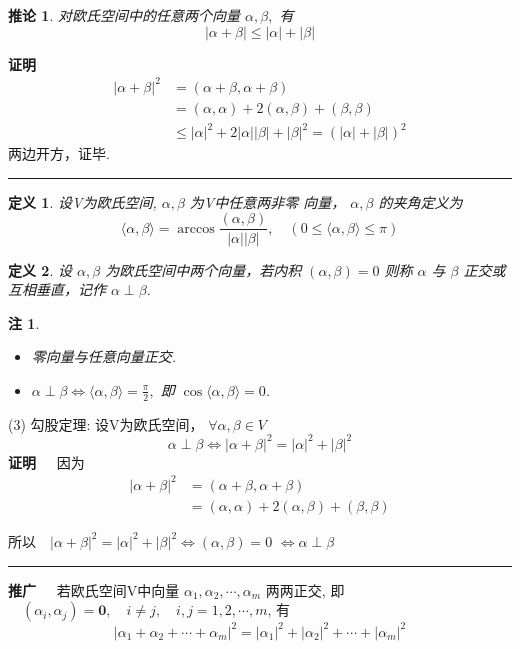 \documentclass[13pt]{beamer}
\newtheorem*{defi}{定义}
\newtheorem*{coro}{推论}
\newtheorem*{rem}{注}
\def\qed{\nopagebreak\hfill{\rule{4pt}{7pt}}\medbreak}
\def\pf{{\bf 证明~~ }}
\begin{document}
\begin{frame}
\begin{coro}
对欧氏空间中的任意两个向量 $\alpha, \beta,$ 有
$$|\alpha+\beta| \leq|\alpha|+|\beta|$$
\end{coro}
\pf 
\[
\begin{aligned}
|\alpha+\beta|^{2}& =(\alpha+\beta, \alpha+\beta) \\
\quad& =(\alpha, \alpha)+2(\alpha, \beta)+(\beta, \beta) \\
\quad & \leq|\alpha|^{2}+2|\alpha||\beta|+|\beta|^{2}=(|\alpha|+|\beta|)^{2}
\end{aligned}
\]
两边开方，证毕.
\qed
\end{frame}




\begin{frame}
\begin{defi}
	设V为欧氏空间, $\alpha, \beta$ 为V中任意两非零
向量， 
$\alpha, \beta$ 的夹角定义为
\[
\langle\alpha, \beta\rangle=\arccos \frac{(\alpha, \beta)}{|\alpha||\beta|},
\quad
(0 \leq\langle\alpha, \beta\rangle \leq \pi)
\]
\end{defi}
%
\begin{defi}
	设 $\alpha, \beta$ 为欧氏空间中两个向量，若内积
$
(\alpha, \beta)=0
$
则称 $\alpha$ 与 $\beta$ 正交或互相垂直，记作 $\alpha \perp \beta$.
\end{defi}
\begin{rem}
	\begin{itemize}
		\item 零向量与任意向量正交.
		 \item $\alpha \perp \beta \Longleftrightarrow\langle\alpha, \beta\rangle=\frac{\pi}{2},$ 即 $\cos \langle\alpha, \beta\rangle=0$.
	\end{itemize}
\end{rem}

\end{frame}

\begin{frame}
(3) 勾股定理:
设V为欧氏空间， $\forall \alpha, \beta \in V$
$$\alpha \perp \beta \Longleftrightarrow|\alpha+\beta|^{2}=|\alpha|^{2}+|\beta|^{2}$$
\pf
因为$$
\begin{aligned}
|\alpha+\beta|^{2}& =(\alpha+\beta, \alpha+\beta) \\ 
	& =(\alpha, \alpha)+2(\alpha, \beta)+(\beta, \beta) 
\end{aligned}$$

所以$\quad|\alpha+\beta|^{2}=|\alpha|^{2}+|\beta|^{2} \Longleftrightarrow(\alpha, \beta)=0$
$\Longleftrightarrow \alpha \perp \beta$ \qed

{\bf 推广~~}  若欧氏空间V中向量 $\alpha_{1}, \alpha_{2}, \cdots, \alpha_{m}$ 两两正交,
即 $\quad\left(\alpha_{i}, \alpha_{j}\right)=\mathbf{0}, \quad i \neq j, \quad i, j=1,2, \cdots, m$, 有
$$\left|\alpha_{1}+\alpha_{2}+\cdots+\alpha_{m}\right|^{2}=\left|\alpha_{1}\right|^{2}+\left|\alpha_{2}\right|^{2}+\cdots+\left|\alpha_{m}\right|^{2}$$

\end{frame}
\end{document}
